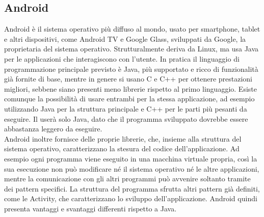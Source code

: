 \subsection{Android}

	Android è il sistema operativo più diffuso al mondo, usato per smartphone, tablet e altri dispositivi, come Android TV e Google Glass, sviluppati da Google, la proprietaria del sistema operativo. Strutturalmente deriva da Linux, ma usa Java per le applicazioni che interagiscono con l'utente. In pratica il linguaggio di programmazione principale previsto è Java, più supportato e ricco di funzionalità già fornite di base, mentre in genere si usano C e C++ per ottenere prestazioni migliori, sebbene siano presenti meno librerie rispetto al primo linguaggio. Esiste comunque la possibilità di usare entrambi per la stessa applicazione, ad esempio utilizzando Java per la struttura principale e C++ per le parti più pesanti da eseguire. Il  userà solo Java, dato che il programma sviluppato dovrebbe essere abbastanza leggero da eseguire. \\
	Android inoltre fornisce delle proprie librerie, che, insieme alla struttura del sistema operativo, caratterizzano la stesura del codice dell'applicazione. Ad esempio ogni programma viene eseguito in una macchina virtuale propria, così la sua esecuzione non può modificare né il sistema operativo né le altre applicazioni, mentre la comunicazione con gli altri programmi può avvenire soltanto tramite dei pattern specifici. La struttura del programma sfrutta altri pattern già definiti, come le Activity, che caratterizzano lo sviluppo dell'applicazione. Android quindi presenta vantaggi e svantaggi differenti rispetto a Java.
	
